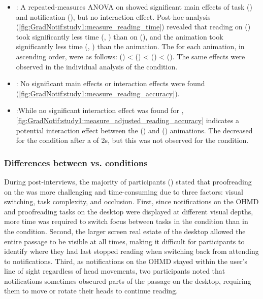 \begin{itemize}
    \item \readingTime{}: A repeated-measures ANOVA on \readingTime{} showed significant main effects of task \location{} () and notification \animation{} (), but no interaction effect. Post-hoc analysis (\autoref{fig:GradNotif:study1:measure_reading_time}) revealed that reading on \glass{} () took significantly less time (, ) than on \desktop{} (), and the \slowfade{} animation took significantly less time (, ) than the \scroll{} animation. The  for each animation, in ascending order, were as follows: \slowfade{} () < \instant{} () < \fastfade{} () < \scroll{} (). The same effects were observed in the individual analysis of the \glass{} condition.

    \item \readingAccuracy{}: No significant main effects or interaction effects were found (\autoref{fig:GradNotif:study1:measure_reading_accuracy}).

    \item \adjustedReadingAccuracy{}:While no significant interaction effect was found for \adjustedReadingAccuracy{}, \autoref{fig:GradNotif:study1:measure_adjusted_reading_accuracy} indicates a potential interaction effect between the \instant{} () and \fastfade{} () animations. The \adjustedReadingAccuracy{} decreased for the \desktop{} condition after a \fadeduration{} of 2s, but this was not observed for the \glass{} condition.
    
\end{itemize}


\subsubsection*{Differences between \glass{} vs. \desktop{} conditions}
\label{sec:GradNotif:study1:task_difference}

During post-interviews, the majority of participants () stated that proofreading on the \desktop{} was more challenging and time-consuming due to three factors: visual switching, task complexity, and occlusion. First, since notifications on the OHMD and proofreading tasks on the desktop were displayed at different visual depths, more time was required to switch focus between tasks in the \desktop{} condition than in the \glass{} condition. Second, the larger screen real estate of the desktop allowed the entire passage to be visible at all times, making it difficult for participants to identify where they had last stopped reading when switching back from attending to notifications. Third, as notifications on the OHMD stayed within the user's line of sight regardless of head movements, two participants noted that notifications sometimes obscured parts of the passage on the desktop, requiring them to move or rotate their heads to continue reading.


